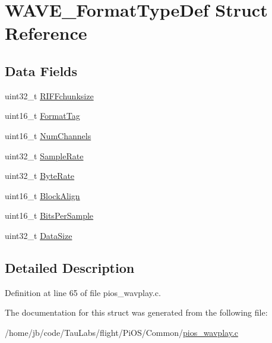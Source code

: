\hypertarget{struct_w_a_v_e___format_type_def}{\section{\-W\-A\-V\-E\-\_\-\-Format\-Type\-Def \-Struct \-Reference}
\label{struct_w_a_v_e___format_type_def}
}
\subsection*{\-Data \-Fields}
\begin{DoxyCompactItemize}
\item 
uint32\-\_\-t \hyperlink{group___w_a_v_e_p_l_a_y_e_r___private___variables_gaeaf1fe0b90f1ff0c7c4bc845e47fe7c5}{\-R\-I\-F\-Fchunksize}
\item 
uint16\-\_\-t \hyperlink{group___w_a_v_e_p_l_a_y_e_r___private___variables_gaa0d6b4c06edc073395827674b4345820}{\-Format\-Tag}
\item 
uint16\-\_\-t \hyperlink{group___w_a_v_e_p_l_a_y_e_r___private___variables_ga2bdeb90779a17e644107a5d855f4d344}{\-Num\-Channels}
\item 
uint32\-\_\-t \hyperlink{group___w_a_v_e_p_l_a_y_e_r___private___variables_ga4f574183b180c6eee94ec82826583941}{\-Sample\-Rate}
\item 
uint32\-\_\-t \hyperlink{group___w_a_v_e_p_l_a_y_e_r___private___variables_ga6f4f0874858518ee7ae3a7beb6bf9f34}{\-Byte\-Rate}
\item 
uint16\-\_\-t \hyperlink{group___w_a_v_e_p_l_a_y_e_r___private___variables_ga50c6bfe090b579d0b94ee9950bb7a03f}{\-Block\-Align}
\item 
uint16\-\_\-t \hyperlink{group___w_a_v_e_p_l_a_y_e_r___private___variables_gaed7cbe094ecca9b29332a1209f88a535}{\-Bits\-Per\-Sample}
\item 
uint32\-\_\-t \hyperlink{group___w_a_v_e_p_l_a_y_e_r___private___variables_ga25442a9c895536fb4a7837811a8fe810}{\-Data\-Size}
\end{DoxyCompactItemize}


\subsection{\-Detailed \-Description}


\-Definition at line 65 of file pios\-\_\-wavplay.\-c.



\-The documentation for this struct was generated from the following file\-:\begin{DoxyCompactItemize}
\item 
/home/jb/code/\-Tau\-Labs/flight/\-Pi\-O\-S/\-Common/\hyperlink{pios__wavplay_8c}{pios\-\_\-wavplay.\-c}\end{DoxyCompactItemize}
